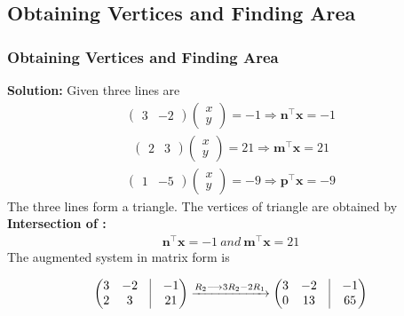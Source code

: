 \documentclass{beamer}
\theoremstyle{remark}
\newcommand{\myvec}[1]{\ensuremath{\begin{pmatrix}#1\end{pmatrix}}}
\let\vec\mathbf
\numberwithin{equation}{section}
\begin{document}
\subsection{Obtaining Vertices and Finding Area}
\begin{frame}
\frametitle{Obtaining Vertices and Finding Area}
\textbf{Solution:}
Given three lines are
\begin{align}
\myvec{3 & -2}\myvec{x\\y} = -1 \Longrightarrow \vec{n}^\top\vec{x} = -1
\end{align}
\begin{align}
\myvec{2 & 3}\myvec{x\\y} = 21 \Longrightarrow \vec{m}^\top\vec{x} = 21
\end{align}
\begin{align}
\myvec{1 & -5}\myvec{x\\y} = -9 \Longrightarrow \vec{p}^\top\vec{x} = -9
\end{align}
The three lines form a triangle.
The vertices of triangle are obtained by 
\textbf{Intersection of :}
\begin{align}
\vec{n}^\top\vec{x} = -1 \ and \ \vec{m}^\top\vec{x} = 21 
\end{align}
The augmented system in matrix form is

\begin{align}
\myvec{
3 & -2 &\vrule& -1\\
2 & 3 &\vrule& 21} \xrightarrow{R_2 \longrightarrow 3R_2-2R_1}
\myvec{
3 & -2 &\vrule& -1\\
0 & 13 &\vrule& 65}
\end{align}
\end{frame}
\end{document}
